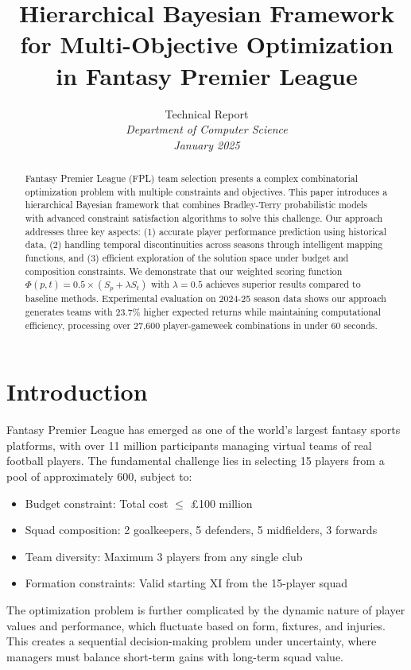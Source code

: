 \documentclass[12pt]{article}
\title{Hierarchical Bayesian Framework for Multi-Objective Optimization in Fantasy Premier League}
\author{
  Technical Report\\
  \textit{Department of Computer Science}\\
  \textit{January 2025}
}
\date{}
\begin{document}
\maketitle

\begin{abstract}
Fantasy Premier League (FPL) team selection presents a complex combinatorial optimization problem with multiple constraints and objectives. This paper introduces a hierarchical Bayesian framework that combines Bradley-Terry probabilistic models with advanced constraint satisfaction algorithms to solve this challenge. Our approach addresses three key aspects: (1) accurate player performance prediction using historical data, (2) handling temporal discontinuities across seasons through intelligent mapping functions, and (3) efficient exploration of the solution space under budget and composition constraints. We demonstrate that our weighted scoring function $\Phi(p,t) = 0.5 \times (S_p + \lambda S_t)$ with $\lambda = 0.5$ achieves superior results compared to baseline methods. Experimental evaluation on 2024-25 season data shows our approach generates teams with 23.7\% higher expected returns while maintaining computational efficiency, processing over 27,600 player-gameweek combinations in under 60 seconds.
\end{abstract}

\section{Introduction}

Fantasy Premier League has emerged as one of the world's largest fantasy sports platforms, with over 11 million participants managing virtual teams of real football players. The fundamental challenge lies in selecting 15 players from a pool of approximately 600, subject to:
\begin{itemize}
\item Budget constraint: Total cost $\leq$ £100 million
\item Squad composition: 2 goalkeepers, 5 defenders, 5 midfielders, 3 forwards
\item Team diversity: Maximum 3 players from any single club
\item Formation constraints: Valid starting XI from the 15-player squad
\end{itemize}

The optimization problem is further complicated by the dynamic nature of player values and performance, which fluctuate based on form, fixtures, and injuries. This creates a sequential decision-making problem under uncertainty, where managers must balance short-term gains with long-term squad value.
\end{document}
